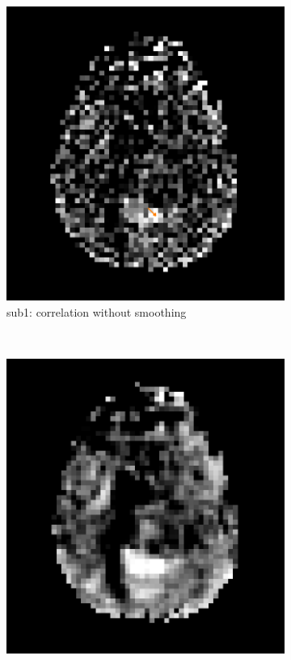 \begin{figure}[p] 
  \centering 
  \begin{subfigure}[t]{0.3\textwidth}
    \centering
    \includegraphics[width=\textwidth]{figures/method1/invivo2/R1_corr_nosmooth}
    \caption{sub1: correlation without smoothing}
    \label{fig:invivo21}
    \end{subfigure}
~
  \begin{subfigure}[t]{0.3\textwidth}
    \centering
    \includegraphics[width=\textwidth]{figures/method1/invivo2/R1_corr_smooth}

\end{subfigure}
\end{figure}
